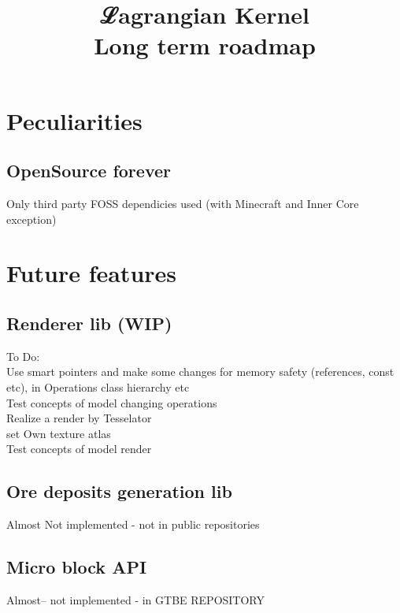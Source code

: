 \documentclass[12pt]{article}
\title{ℒagrangian Kernel \\ Long term roadmap}
\begin{document}
	\maketitle

	\section{Peculiarities}

	\subsection{OpenSource forever}
	
	Only third party FOSS dependicies used (with Minecraft and Inner Core exception)

	\section{Future features}

	\subsection{Renderer lib (WIP)}
	    
		To Do: \\
		Use smart pointers and make some changes for memory safety (references, const etc), in Operations class hierarchy etc \\
		Test concepts of model changing operations \\
		Realize a render by Tesselator \\
		set Own texture atlas \\
		Test concepts of model render
	
	\subsection{Ore deposits generation lib} 
	
	Almost Not implemented - not in public repositories

	\subsection{Micro block API} 
	Almost-- not implemented - in GTBE REPOSITORY
\end{document}
